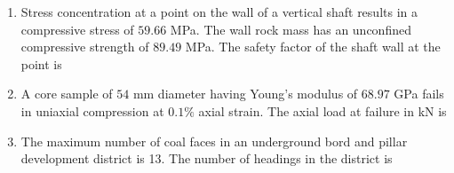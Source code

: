 \documentclass[journal]{IEEEtran}
\begin{document}
\begin{enumerate}
\begin{enumerate}
\end{enumerate}

\item Stress concentration at a point on the wall of a vertical shaft results in a compressive stress of $59.66$ MPa. The wall rock mass has an unconfined compressive strength of $89.49$ MPa. The safety factor of the shaft wall at the point is
\begin{enumerate}
\end{enumerate}

\item A core sample of $54$ mm diameter having Young$’$s modulus of $68.97$ GPa fails in uniaxial compression at $0.1\%$ axial strain. The axial load at failure in kN is
\begin{enumerate}
\end{enumerate}

\item The maximum number of coal faces in an underground bord and pillar development district is 13. The number of headings in the district is
\begin{enumerate}
\end{enumerate}


\end{enumerate}
\end{document}
